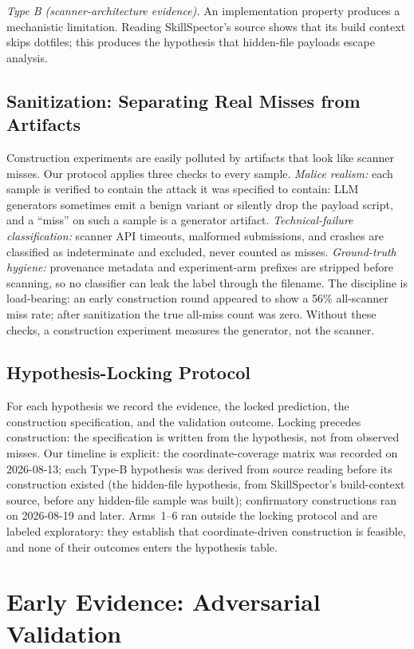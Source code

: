 \documentclass[sigconf,nonacm]{acmart}
\begin{document}
\emph{Type B (scanner-architecture evidence).} An implementation property produces a mechanistic limitation. Reading SkillSpector's source shows that its build context skips dotfiles; this produces the hypothesis that hidden-file payloads escape analysis.

\subsection{Sanitization: Separating Real Misses from Artifacts}
Construction experiments are easily polluted by artifacts that look like scanner misses. Our protocol applies three checks to every sample. \emph{Malice realism:} each sample is verified to contain the attack it was specified to contain: LLM generators sometimes emit a benign variant or silently drop the payload script, and a ``miss'' on such a sample is a generator artifact. \emph{Technical-failure classification:} scanner API timeouts, malformed submissions, and crashes are classified as indeterminate and excluded, never counted as misses. \emph{Ground-truth hygiene:} provenance metadata and experiment-arm prefixes are stripped before scanning, so no classifier can leak the label through the filename. The discipline is load-bearing: an early construction round appeared to show a 56\% all-scanner miss rate; after sanitization the true all-miss count was zero. Without these checks, a construction experiment measures the generator, not the scanner.

\subsection{Hypothesis-Locking Protocol}
For each hypothesis we record the evidence, the locked prediction, the construction specification, and the validation outcome. Locking precedes construction: the specification is written from the hypothesis, not from observed misses. Our timeline is explicit: the coordinate-coverage matrix was recorded on 2026-08-13; each Type-B hypothesis was derived from source reading before its construction existed (the hidden-file hypothesis, from SkillSpector's build-context source, before any hidden-file sample was built); confirmatory constructions ran on 2026-08-19 and later. Arms~1--6 ran outside the locking protocol and are labeled exploratory: they establish that coordinate-driven construction is feasible, and none of their outcomes enters the hypothesis table.

\section{Early Evidence: Adversarial Validation}
\label{sec:validate}
\end{document}
